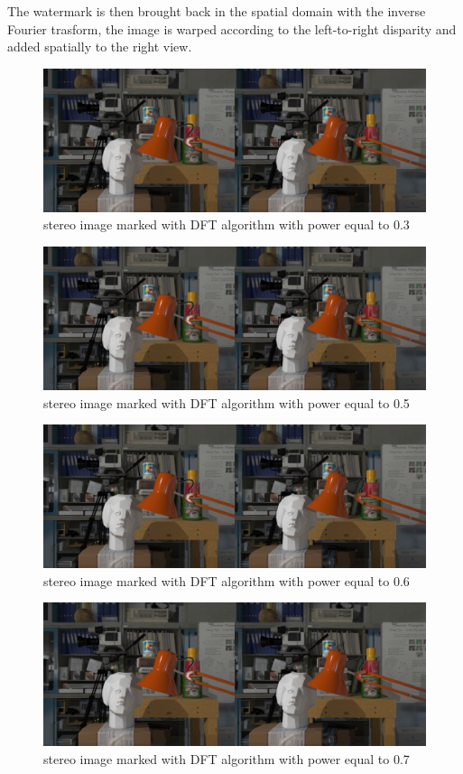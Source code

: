 The watermark is then brought back in the spatial domain with the inverse Fourier trasform, the image is warped according to the left-to-right disparity and added spatially to the right view.
\begin{figure}[h!]
\centering
\includegraphics[width=1\textwidth]{./img/marked_03_DFT.png}
\caption{\small{stereo image marked with DFT algorithm with power equal to 0.3}}
\label{fig:dft03}
\end{figure}
\begin{figure}[h!]
\centering
\includegraphics[width=1\textwidth]{./img/marked_05_DFT.png}
\caption{\small{stereo image marked with DFT algorithm with power equal to 0.5}}
\label{fig:dft05}
\end{figure}
\begin{figure}[h!]
\centering
\includegraphics[width=1\textwidth]{./img/marked_06_DFT.png}
\caption{\small{stereo image marked with DFT algorithm with power equal to 0.6}}
\label{fig:dft06}
\end{figure}
\begin{figure}[h!]
\centering
\includegraphics[width=1\textwidth]{./img/marked_07_DFT.png}
\caption{\small{stereo image marked with DFT algorithm with power equal to 0.7}}
\label{fig:dft07}
\end{figure}
